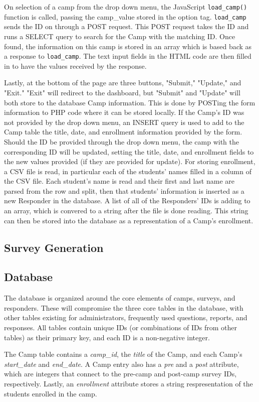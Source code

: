\documentclass[letterpaper,10pt,serif,draftclsnofoot,onecolumn,compsoc,titlepage]{IEEEtran}
\begin{document}
On selection of a camp from the drop down menu, the JavaScript \texttt{load\_camp()} function is called, passing the camp\_value stored in the option tag.
\texttt{load\_camp} sends the ID on through a POST request.
This POST request takes the ID and runs a SELECT query to search for the Camp with the matching ID.
Once found,  the information on this camp is stored in an array which is based back as a response to \texttt{load\_camp}.
The text input fields in the HTML code are then filled in to have the values received by the response.

Lastly, at the bottom of the page are three buttons, "Submit," "Update," and "Exit."
"Exit" will redirect to the dashboard, but "Submit" and "Update" will both store to the database Camp information.
This is done by POSTing the form information to PHP code where it can be stored locally.
If the Camp's ID was not provided by the drop down menu, an INSERT query is used to add to the Camp table the title, date, and enrollment information provided by the form.
Should the ID be provided through the drop down menu, the camp with the corresponding ID will be updated, setting the title, date, and enrollment fields to the new values provided (if they are provided for update).
For storing enrollment, a CSV file is read, in particular each of the students' names filled in a column of the CSV file.
Each student's name is read and their first and last name are parsed from the row and split, then that students' information is inserted as a new Responder in the database.
A list of all of the Responders' IDs is adding to an array, which is convered to a string after the file is done reading.
This string can then be stored into the database as a representation of a Camp's enrollment.
\subsection{Survey Generation}
\subsection{Database}
The database is organized around the core elements of camps, surveys, and responders.
These will compromise the three core tables in the database, with other tables existing for administrators, frequently used questions, reports, and responses.
All tables contain unique IDs (or combinations of IDs from other tables) as their primary key, and each ID is a non-negative integer.

The Camp table contains a \emph{camp\_id}, the \emph{title} of the Camp, and each Camp's \emph{start\_date} and \emph{end\_date}.
A Camp entry also has a \emph{pre} and a \emph{post} attribute, which are integers that connect to the pre-camp and post-camp survey IDs, respectively.
Lastly, an \emph{enrollment} attribute stores a string respresentation of the students enrolled in the camp.
\end{document}
